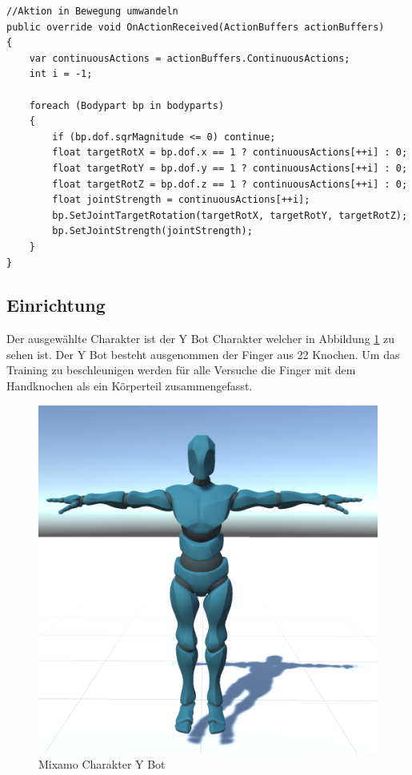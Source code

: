 \begin{lstlisting}[caption={Ausschnitt Angepasstes Walker Agent Skript},captionpos=b,label={lst:walker_agent_angepasst}]
//Aktion in Bewegung umwandeln
public override void OnActionReceived(ActionBuffers actionBuffers)
{
    var continuousActions = actionBuffers.ContinuousActions;
    int i = -1;

    foreach (Bodypart bp in bodyparts)
    {
        if (bp.dof.sqrMagnitude <= 0) continue;
        float targetRotX = bp.dof.x == 1 ? continuousActions[++i] : 0;
        float targetRotY = bp.dof.y == 1 ? continuousActions[++i] : 0;
        float targetRotZ = bp.dof.z == 1 ? continuousActions[++i] : 0;
        float jointStrength = continuousActions[++i];
        bp.SetJointTargetRotation(targetRotX, targetRotY, targetRotZ);
        bp.SetJointStrength(jointStrength);
    }
}
\end{lstlisting}


\subsection{Einrichtung}
Der ausgewählte Charakter ist der Y Bot Charakter welcher in Abbildung \ref{fig:charakter_mixamo} zu sehen ist. Der Y Bot besteht ausgenommen der Finger aus 22 Knochen. Um das Training zu beschleunigen werden für alle Versuche die Finger mit dem Handknochen als ein Körperteil zusammengefasst.

\begin{figure}[H]
  \centering  
  \includegraphics[scale=0.5]{img/charakter_mixamo}
  \caption{Mixamo Charakter Y Bot}
  \label{fig:charakter_mixamo}
\end{figure}

